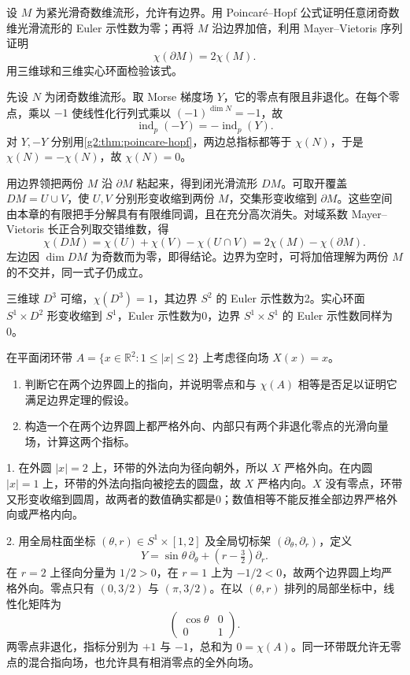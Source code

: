 \begin{exercise}\label{g2:ex:odd-boundary-euler}
	设 \(M\) 为紧光滑奇数维流形，允许有边界。用 Poincaré--Hopf 公式证明任意闭奇数维光滑流形的 Euler 示性数为零；再将 \(M\) 沿边界加倍，利用 Mayer--Vietoris 序列证明
	\[
		\chi(\partial M)=2\chi(M).
	\]
	用三维球和三维实心环面检验该式。
\end{exercise}
\begin{solution}
	先设 \(N\) 为闭奇数维流形。取 Morse 梯度场 \(Y\)，它的零点有限且非退化。在每个零点，乘以 \(-1\) 使线性化行列式乘以 \((-1)^{\dim N}=-1\)，故
	\[
		\operatorname{ind}_p(-Y)=-\operatorname{ind}_p(Y).
	\]
	对 \(Y,-Y\) 分别用\cref{g2:thm:poincare-hopf}，两边总指标都等于 \(\chi(N)\)，于是 \(\chi(N)=-\chi(N)\)，故 \(\chi(N)=0\)。

	用边界领把两份 \(M\) 沿 \(\partial M\) 粘起来，得到闭光滑流形 \(DM\)。可取开覆盖 \(DM=U\cup V\)，使 \(U,V\) 分别形变收缩到两份 \(M\)，交集形变收缩到 \(\partial M\)。这些空间由本章的有限把手分解具有有限维同调，且在充分高次消失。对域系数 Mayer--Vietoris 长正合列取交错维数，得
	\[
		\chi(DM)=\chi(U)+\chi(V)-\chi(U\cap V)
		=2\chi(M)-\chi(\partial M).
	\]
	左边因 \(\dim DM\) 为奇数而为零，即得结论。边界为空时，可将加倍理解为两份 \(M\) 的不交并，同一式子仍成立。

	三维球 \(D^3\) 可缩，\(\chi(D^3)=1\)，其边界 \(S^2\) 的 Euler 示性数为2。实心环面 \(S^1\times D^2\) 形变收缩到 \(S^1\)，Euler 示性数为0，边界 \(S^1\times S^1\) 的 Euler 示性数同样为0。
\end{solution}

\begin{exercise}\label{g2:ex:annulus-boundary-index}
	在平面闭环带 \(A=\{x\in\mathbb R^2:1\le|x|\le2\}\) 上考虑径向场 \(X(x)=x\)。
	\begin{enumerate}
		\item 判断它在两个边界圆上的指向，并说明零点和与 \(\chi(A)\) 相等是否足以证明它满足边界定理的假设。
		\item 构造一个在两个边界圆上都严格外向、内部只有两个非退化零点的光滑向量场，计算这两个指标。
	\end{enumerate}
\end{exercise}
\begin{solution}
	1. 在外圆 \(|x|=2\) 上，环带的外法向为径向朝外，所以 \(X\) 严格外向。在内圆 \(|x|=1\) 上，环带的外法向指向被挖去的圆盘，故 \(X\) 严格内向。\(X\) 没有零点，环带又形变收缩到圆周，故两者的数值确实都是0；数值相等不能反推全部边界严格外向或严格内向。

	2. 用全局柱面坐标 \((\theta,r)\in S^1\times[1,2]\) 及全局切标架 \((\partial_\theta,\partial_r)\)，定义
	\[
		Y=\sin\theta\,\partial_\theta+(r-\tfrac32)\partial_r.
	\]
	在 \(r=2\) 上径向分量为 \(1/2>0\)，在 \(r=1\) 上为 \(-1/2<0\)，故两个边界圆上均严格外向。零点只有 \((0,3/2)\) 与 \((\pi,3/2)\)。在以 \((\theta,r)\) 排列的局部坐标中，线性化矩阵为
	\[
		\begin{pmatrix}\cos\theta&0\\0&1\end{pmatrix}.
	\]
	两零点非退化，指标分别为 \(+1\) 与 \(-1\)，总和为 \(0=\chi(A)\)。同一环带既允许无零点的混合指向场，也允许具有相消零点的全外向场。
\end{solution}

